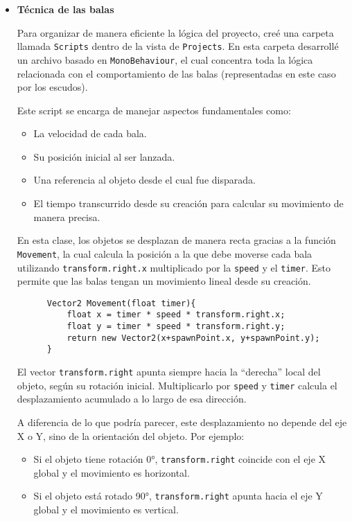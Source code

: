 \documentclass[11pt]{article}
\begin{document}
  \begin{itemize}
    \item \textbf{Técnica de las balas}
    \vspace{0.5cm}

    Para organizar de manera eficiente la lógica del proyecto, creé una carpeta llamada \texttt{Scripts} dentro de la vista de \texttt{Projects}. En esta carpeta desarrollé un archivo basado en \texttt{MonoBehaviour}, el cual concentra toda la lógica relacionada con el comportamiento de las balas (representadas en este caso por los escudos).

    \vspace{0.5cm}

    Este script se encarga de manejar aspectos fundamentales como:
    \begin{itemize}
      \item La velocidad de cada bala.
      \item Su posición inicial al ser lanzada.
      \item Una referencia al objeto desde el cual fue disparada.
      \item El tiempo transcurrido desde su creación para calcular su movimiento de manera precisa.
    \end{itemize}

    En esta clase, los objetos se desplazan de manera recta gracias a la función \texttt{Movement}, la cual calcula la posición a la que debe moverse cada bala utilizando \texttt{transform.right.x} multiplicado por la \texttt{speed} y el \texttt{timer}. Esto permite que las balas tengan un movimiento lineal desde su creación.

    \begin{verbatim}
      Vector2 Movement(float timer){
          float x = timer * speed * transform.right.x;
          float y = timer * speed * transform.right.y;
          return new Vector2(x+spawnPoint.x, y+spawnPoint.y);
      }
    \end{verbatim}

    El vector \texttt{transform.right} apunta siempre hacia la “derecha” local del objeto, según su rotación inicial. Multiplicarlo por \texttt{speed} y \texttt{timer} calcula el desplazamiento acumulado a lo largo de esa dirección.  

    \vspace{0.5cm}

    A diferencia de lo que podría parecer, este desplazamiento no depende del eje X o Y, sino de la orientación del objeto. Por ejemplo:  
    \begin{itemize}
        \item Si el objeto tiene rotación 0°, \texttt{transform.right} coincide con el eje X global y el movimiento es horizontal.  
        \item Si el objeto está rotado 90°, \texttt{transform.right} apunta hacia el eje Y global y el movimiento es vertical.  
    \end{itemize}


\end{itemize}
\end{document}
